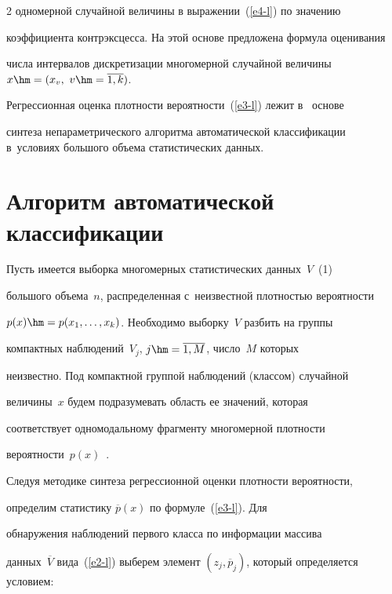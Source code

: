 \begin{multicols}{2}
одномерной случайной величины в выражении~(\ref{e4-l}) по значению 


коэффициента контрэксцесса. На этой основе предложена формула оценивания 


числа интервалов дискретизации многомерной случайной величины $x\hm= 


(x_v,\ v\hm=\overline{1,k})$.


  


  Регрессионная оценка плотности ве\-ро\-ят\-ности~(\ref{e3-l}) лежит в~ основе 


синтеза непараметрического алгоритма автоматической классификации в~условиях большого объема статистических данных.


  


\section{Алгоритм автоматической классификации}





Пусть имеется выборка многомерных статистических данных~$V$~(1) 


большого объема~$n$, распределенная с~неизвестной плот\-ностью ве\-ро\-ят\-ности 


$p(x)\hm= p(x_1, \ldots , x_k)$. Необходимо выборку~$V$ разбить на группы 


компактных наблюдений~$V_j$, $j\hm=\overline{1,M}$, чис\-ло~$M$ которых 


неизвестно. Под компактной группой наблюдений (классом) случайной 


величины~$x$ будем подразумевать об\-ласть ее значений, которая 


соответствует одномодальному фрагменту многомерной плот\-ности 


ве\-ро\-ят\-ности~$p(x)$~\cite{11-l, 12-l}.





  Следуя методике синтеза регрессионной оценки плотности вероятности, 


определим статистику $\overline{p}(x)$ по формуле~(\ref{e3-l}). Для 


обнаружения наблюдений первого класса по информации массива 


данных~$\overline{V}$ вида~(\ref{e2-l}) выберем элемент $(z_j, 


\overline{p}_j)$, который определяется условием:



\end{multicols}
